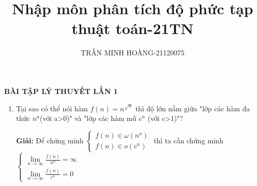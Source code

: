 \documentclass[12pt,a4paper]{article}
\title{\LARGE{\textbf{Nhập môn phân tích độ phức tạp thuật toán-21TN}}}
\author{TRẦN MINH HOÀNG-21120075}
\date{} %
\begin{document}
\maketitle
\begin{center}
    \textbf{BÀI TẬP LÝ THUYẾT LẦN 1}
\end{center}


\begin{enumerate}[label=\textbf{Câu 1.\arabic*} ]
    \item Tại sao có thể nói hàm $f(n)=n^{\sqrt{n}}$ thì độ lớn nằm giữa "lớp các hàm đa thức $n^a$(với a>0)" và "lớp các hàm mũ $c^n$ (với c>1)"?
        
    
        \textbf{Giải:} Để chứng minh $\begin{cases}
            f(n)\in \omega(n^a)\\
            f(n)\in o (c^n)
        \end{cases}$
        thì ta cần chứng minh $\begin{cases}
            \lim\limits_{n \to \infty} \frac{f(n)}{n^a}=\infty  \\
            \lim\limits_{n \to \infty} \frac{f(n)}{c^n}=0
        \end{cases}$
\end{enumerate}
\end{document}
